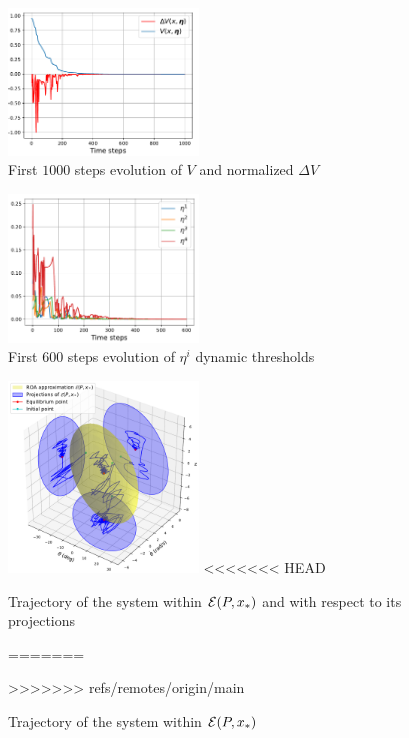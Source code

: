 \documentclass{ifacconf}
\theoremstyle{plain}
\begin{document}
\begin{figure}[H]
    \centering
    \includegraphics[width=0.45\textwidth]{Figures/lyapunov_plot}
    \caption{First $1000$ steps evolution of $V$ and normalized $\Delta V$}
    \label{fig:lyapunov}
\end{figure}

\begin{figure}[H]
    \centering
    \includegraphics[width=0.45\textwidth]{Figures/eta_plot}
    \caption{First $600$ steps evolution of $\eta^i$ dynamic thresholds}
    \label{fig:eta}
\end{figure}

\begin{figure}[H]
    \centering
    \includegraphics[width=0.45\textwidth]{Figures/ellipsoid_plot}
<<<<<<< HEAD
    \caption{Trajectory of the system within ${\mathcal{E}}(P, x_*)$ and with respect to its projections}
=======
    \caption{Trajectory of the system within ${\mathcal{E}}(P, x_*)$}
>>>>>>> refs/remotes/origin/main
    \label{fig:ellipsoid}
\end{figure}
\end{document}
